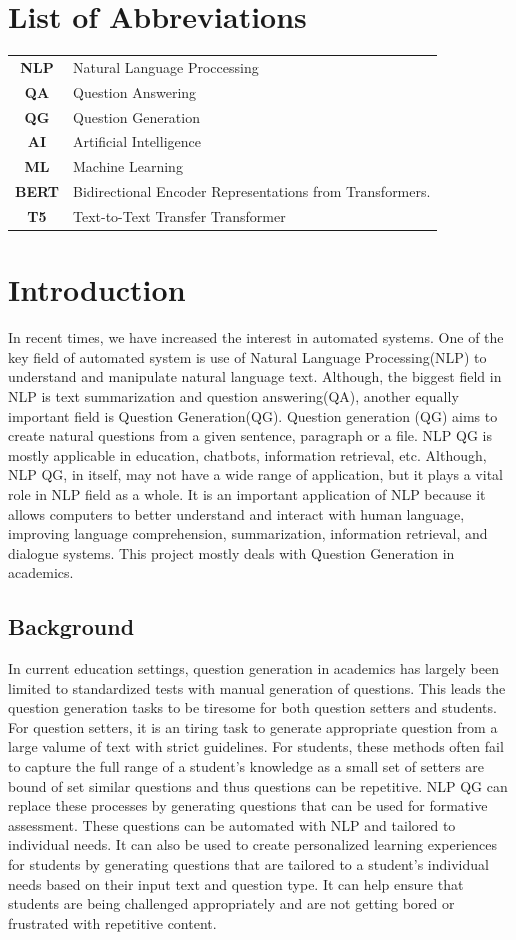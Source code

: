 \documentclass[12pt]{report}
\begin{document}
\chapter*{List of Abbreviations}
\begin{tabular}{c l}
\textbf{NLP}     &  Natural Language Proccessing\\
\textbf{QA}     &  Question Answering \\
\textbf{QG} & Question Generation \\
\textbf{AI} & Artificial Intelligence \\
\textbf{ML} & Machine Learning \\
\textbf{BERT} & Bidirectional Encoder Representations from Transformers.\\
\textbf{T5} & Text-to-Text Transfer Transformer
\end{tabular}


\chapter{Introduction}
In recent times, we have increased the interest in automated systems. One of the key field of automated system is use of Natural Language Processing(NLP) to understand and manipulate natural language text. Although, the biggest field in NLP is text summarization and question answering(QA), another equally important field is Question Generation(QG). Question generation (QG) aims to create natural questions from a given sentence, paragraph or a file. NLP QG is mostly applicable in education, chatbots, information retrieval, etc. Although, NLP QG, in itself, may not have a wide range of application, but it plays a vital role in NLP field as a whole. It is an important application of NLP because it allows computers to better understand and interact with human language, improving language comprehension, summarization, information retrieval, and dialogue systems. This project mostly deals with Question Generation in academics. 
\section{Background}
In current education settings, question generation in academics has largely been limited to standardized tests with manual generation of questions.  This leads the question generation tasks to be tiresome for both question setters and students. For question setters, it is an tiring task to generate appropriate question from a large valume of text with strict guidelines. For students,  these methods often fail to capture the full range of a student's knowledge as a small set of setters are bound of set similar questions and thus questions can be repetitive. NLP QG can replace these processes by generating questions that can be used for formative assessment. These questions can be automated with NLP and tailored to individual needs. It can also be used to create personalized learning experiences for students by generating questions that are tailored to a student's 
individual needs based on their input text and question type. It can help ensure that students are being challenged appropriately and are not getting bored or frustrated with repetitive content.
\end{document}
